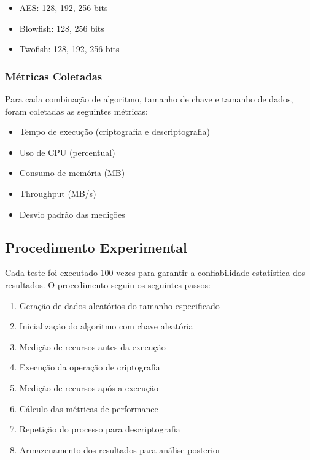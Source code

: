 \documentclass[12pt,a4paper,oneside]{article}
\begin{document}
\begin{itemize}
    \item AES: 128, 192, 256 bits
    \item Blowfish: 128, 256 bits
    \item Twofish: 128, 192, 256 bits
\end{itemize}

\subsubsection{Métricas Coletadas}

Para cada combinação de algoritmo, tamanho de chave e tamanho de dados, foram coletadas as seguintes métricas:

\begin{itemize}
    \item Tempo de execução (criptografia e descriptografia)
    \item Uso de CPU (percentual)
    \item Consumo de memória (MB)
    \item Throughput (MB/s)
    \item Desvio padrão das medições
\end{itemize}

\subsection{Procedimento Experimental}

Cada teste foi executado 100 vezes para garantir a confiabilidade estatística dos resultados. O procedimento seguiu os seguintes passos:

\begin{enumerate}
    \item Geração de dados aleatórios do tamanho especificado
    \item Inicialização do algoritmo com chave aleatória
    \item Medição de recursos antes da execução
    \item Execução da operação de criptografia
    \item Medição de recursos após a execução
    \item Cálculo das métricas de performance
    \item Repetição do processo para descriptografia
    \item Armazenamento dos resultados para análise posterior
\end{enumerate}
\end{document}
